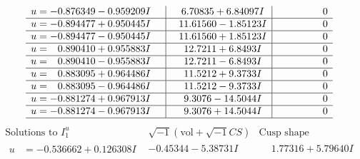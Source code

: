 \documentclass[1p]{elsarticle_modified}
\theoremstyle{definition}
\newcommand{\I}{\sqrt{-1}}
\begin{document}
$$\begin{array}{c|c|c}
\begin{aligned}
u &= -0.876349 - 0.959209 I\end{aligned}
 & \phantom{-}6.70835 + 6.84097 I & \phantom{-0.000000 } 0 \\ \hline\begin{aligned}
u &= -0.894477 + 0.950445 I\end{aligned}
 & \phantom{-}11.61560 - 1.85123 I & \phantom{-0.000000 } 0 \\ \hline\begin{aligned}
u &= -0.894477 - 0.950445 I\end{aligned}
 & \phantom{-}11.61560 + 1.85123 I & \phantom{-0.000000 } 0 \\ \hline\begin{aligned}
u &= \phantom{-}0.890410 + 0.955883 I\end{aligned}
 & \phantom{-}12.7211 + 6.8493 I & \phantom{-0.000000 } 0 \\ \hline\begin{aligned}
u &= \phantom{-}0.890410 - 0.955883 I\end{aligned}
 & \phantom{-}12.7211 - 6.8493 I & \phantom{-0.000000 } 0 \\ \hline\begin{aligned}
u &= \phantom{-}0.883095 + 0.964486 I\end{aligned}
 & \phantom{-}11.5212 + 9.3733 I & \phantom{-0.000000 } 0 \\ \hline\begin{aligned}
u &= \phantom{-}0.883095 - 0.964486 I\end{aligned}
 & \phantom{-}11.5212 - 9.3733 I & \phantom{-0.000000 } 0 \\ \hline\begin{aligned}
u &= -0.881274 + 0.967913 I\end{aligned}
 & \phantom{-}9.3076 - 14.5044 I & \phantom{-0.000000 } 0 \\ \hline\begin{aligned}
u &= -0.881274 - 0.967913 I\end{aligned}
 & \phantom{-}9.3076 + 14.5044 I & \phantom{-0.000000 } 0\\
 \hline 
 \end{array}$$\newpage$$\begin{array}{c|c|c}  
\text{Solutions to }I^u_{1}& \I (\text{vol} + \sqrt{-1}CS) & \text{Cusp shape}\\
 \hline 
\begin{aligned}
u &= -0.536662 + 0.126308 I\end{aligned}
 & -0.45344 - 5.38731 I & \phantom{-}1.77316 + 5.79640 I \\ \hline\begin{aligned}

\end{aligned}
\end{array}$$
\end{document}
